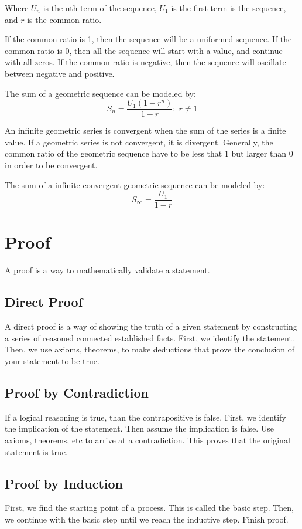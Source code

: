 \documentclass[../notes.tex]{subfiles}
\begin{document}
Where $U_n$ is the nth term of the sequence,
$U_1$ is the first term is the sequence, 
and $r$ is the common ratio.

If the common ratio is 1, then the sequence will be a uniformed sequence.
If the common ratio is 0, then all the sequence will start with a value, and continue with all zeros.
If the common ratio is negative, then the sequence will oscillate between negative and positive.

The sum of a geometric sequence can be modeled by:
\begin{equation}
	S_n = \frac{U_1(1-r^n)}{1-r}; \; r\neq1
\end{equation}

An infinite geometric series is convergent when the sum of the series is a finite value.
If a geometric series is not convergent, it is divergent.
Generally, the common ratio of the geometric sequence have to be less that 1 but larger than 0 in order to be convergent.

The sum of a infinite convergent geometric sequence can be modeled by:
\begin{equation}
	S_\infty = \frac{U_1}{1-r}
\end{equation}

\section{Proof}
A proof is a way to mathematically validate a statement.

\subsection{Direct Proof}

A direct proof is a way of showing the truth of a given statement by constructing a series of reasoned connected established facts.
First, we identify the statement.
Then, we use axioms, theorems, to make deductions that prove the conclusion of your statement to be true.

\subsection{Proof by Contradiction}
If a logical reasoning is true, than the contrapositive is false.
First, we identify the implication of the statement.
Then assume the implication is false.
Use axioms, theorems, etc to arrive at a contradiction.
This proves that the original statement is true.


\subsection{Proof by Induction}
First, we find the starting point of a process.
This is called the basic step.
Then, we continue with the basic step until we reach the inductive step.
Finish proof.
\end{document}
